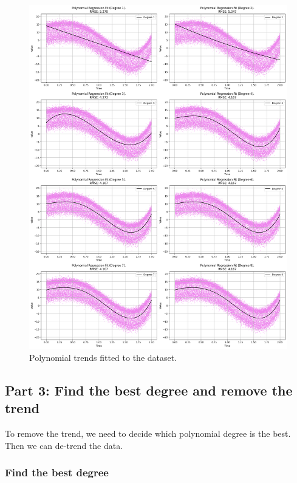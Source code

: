 \documentclass[a4paper]{article}
\begin{document}
\begin{figure}[htbp]
  \centering
  \includegraphics[width=\textwidth]{images/poly_trends.png}\caption{
    Polynomial trends fitted to the dataset.
  }\label{fig:poly-trend}
\end{figure}

\subsection*{Part 3: Find the best degree and remove the trend}

To remove the trend, we need to decide which polynomial degree is the best. Then we can de-trend the data.

\subsubsection*{Find the best degree}
\end{document}
